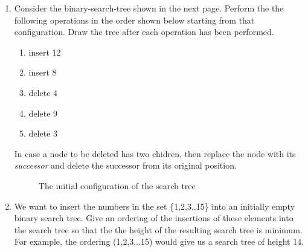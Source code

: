 \begin{enumerate}
\item  Consider the binary-search-tree shown in the next page. Perform the
the following operations in the order shown below starting from that
configuration. Draw the tree after each operation has been performed.

\begin{enumerate}
\item  insert 12 
\item  insert 8
\item  delete 4 
\item  delete 9
\item  delete 3
\end{enumerate}

In case a node to be deleted has two chidren, then replace the node
with its {\em successor} and delete the successor from its original
position.

\begin{figure}[h]
\centerline{}
\caption{The initial configuration of the search tree}
\end{figure}

\item  We want to insert the numbers in the set \{1,2,3..15\} into an
initially empty binary search tree. Give an ordering of the insertions
of these elements into the search tree so that the the height of the
resulting search tree is minimum. For example, the ordering
(1,2,3...15) would give us a search tree of height 14.
\end{enumerate}


